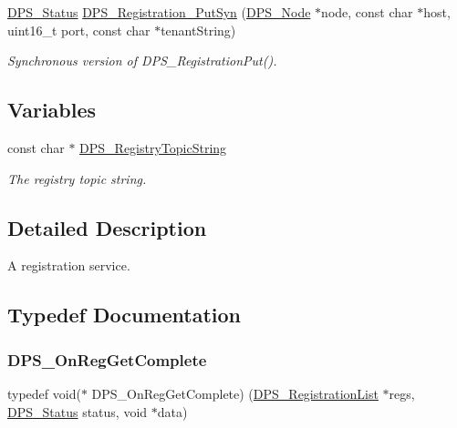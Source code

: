 \begin{DoxyCompactItemize}
\hyperlink{group__status_ga30395a84d3cad9d4ec29848106415038}{D\+P\+S\+\_\+\+Status} \hyperlink{group__registration_ga19a9b2743c27769b371c1fc8b97eced1}{D\+P\+S\+\_\+\+Registration\+\_\+\+Put\+Syn} (\hyperlink{group__node_ga4dd612ab965134321bb57fdb065f121c}{D\+P\+S\+\_\+\+Node} $\ast$node, const char $\ast$host, uint16\+\_\+t port, const char $\ast$tenant\+String)
\begin{DoxyCompactList}\small\item\em Synchronous version of D\+P\+S\+\_\+\+Registration\+Put(). \end{DoxyCompactList}\end{DoxyCompactItemize}
\subsection*{Variables}
\begin{DoxyCompactItemize}
\item 
\mbox{\label{group__registration_ga7c1111f95ed473c1b27fa3c9ee096796}} 
const char $\ast$ \hyperlink{group__registration_ga7c1111f95ed473c1b27fa3c9ee096796}{D\+P\+S\+\_\+\+Registry\+Topic\+String}
\begin{DoxyCompactList}\small\item\em The registry topic string. \end{DoxyCompactList}\end{DoxyCompactItemize}


\subsection{Detailed Description}
A registration service. 



\subsection{Typedef Documentation}
\mbox{\label{group__registration_gad6b4f95f999e950345587b5ae2de69e2}} 
\subsubsection{\texorpdfstring{D\+P\+S\+\_\+\+On\+Reg\+Get\+Complete}{DPS\_OnRegGetComplete}}
{\footnotesize\ttfamily typedef void($\ast$ D\+P\+S\+\_\+\+On\+Reg\+Get\+Complete) (\hyperlink{group__registration_ga2b9489ff306ad253d24b03c418a6eda0}{D\+P\+S\+\_\+\+Registration\+List} $\ast$regs, \hyperlink{group__status_ga30395a84d3cad9d4ec29848106415038}{D\+P\+S\+\_\+\+Status} status, void $\ast$data)}



